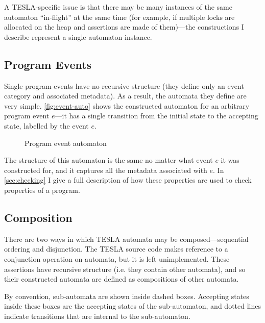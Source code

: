 A TESLA-specific issue is that there may be many instances of the same automaton
``in-flight'' at the same time (for example, if multiple locks are allocated on
the heap and assertions are made of them)---the constructions I describe
represent a single automaton instance.

\subsection{Program Events}

Single program events have no recursive structure (they define only an event
category and associated metadata). As a result, the automata they define are
very simple. \autoref{fig:event-auto} shows the constructed automaton for an
arbitrary program event $e$---it has a single transition from the initial state
to the accepting state, labelled by the event $e$.

\begin{figure}
  \centering
  \caption{Program event automaton}
  \label{fig:event-auto}
\end{figure}

The structure of this automaton is the same no matter what event $e$ it was
constructed for, and it captures all the metadata associated with $e$. In
\autoref{sec:checking} I give a full description of how these properties are
used to check properties of a program.

\subsection{Composition}

There are two ways in which TESLA automata may be composed---sequential ordering
and disjunction. The TESLA source code makes reference to a conjunction
operation on automata, but it is left unimplemented. These assertions have
recursive structure (i.e.  they contain other automata), and so their
constructed automata are defined as compositions of other automata.

By convention, sub-automata are shown inside dashed boxes. Accepting states
inside these boxes are the accepting states of the sub-automaton, and dotted
lines indicate transitions that are internal to the sub-automaton.

